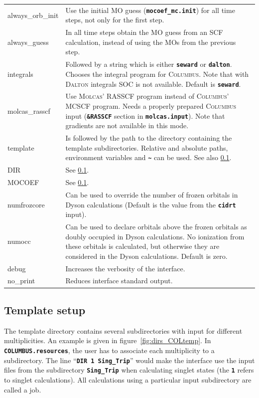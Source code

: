 \documentclass[a4paper,10pt,DIV=15,openany]{scrbook}
\newcommand{\ttt}[1]{\textbf{\texttt{#1}}}
\begin{document}
\begin{longtable}{>{\ttfamily}lp{12cm}}
always\_orb\_init    &Use the initial MO guess (\ttt{mocoef\_mc.init}) for all time steps, not only for the first step.\\
always\_guess     &In all time steps obtain the MO guess from an SCF calculation, instead of using the MOs from the previous step.\\
integrals       &Followed by a string which is either \ttt{seward} or \ttt{dalton}. Chooses the integral program for \textsc{Columbus}. Note that with \textsc{Dalton} integrals SOC is not available. Default is \ttt{seward}.\\
molcas\_rasscf  &Use \textsc{Molcas}' RASSCF program instead of \textsc{Columbus}' MCSCF program. Needs a properly prepared \textsc{Columbus} input (\ttt{\&RASSCF} section in \ttt{molcas.input}). Note that gradients are not available in this mode.\\
template        &Is followed by the path to the directory containing the template subdirectories. Relative and absolute paths, environment variables and \ttt{\textasciitilde} can be used. See also \ref{int:col:template}.\\
DIR             &See \ref{int:col:template}.\\
MOCOEF          &See \ref{int:col:template}.\\
numfrozcore           &Can be used to override the number of frozen orbitals in Dyson calculations (Default is the value from the \ttt{cidrt} input).\\
numocc           &Can be used to declare orbitals above the frozen orbitals as doubly occupied in Dyson calculations. No ionization from these orbitals is calculated, but otherwise they are considered in the Dyson calculations. Default is zero.\\
  debug           &Increases the verbosity of the interface.\\
  no\_print       &Reduces interface standard output.\\
\end{longtable}



\subsection{Template setup}\label{int:col:template}

The template directory contains several subdirectories with input for different multiplicities. An example is given in figure~\ref{fig:dirs_COLtemp}. In \ttt{COLUMBUS.resources}, the user has to associate each multiplicity to a subdirectory. The line ``\ttt{DIR 1 Sing\_Trip}'' would make the interface use the input files from the subdirectory \ttt{Sing\_Trip} when calculating singlet states (the \ttt{1} refers to singlet calculations). All calculations using a particular input subdirectory are called a job.
\end{document}
